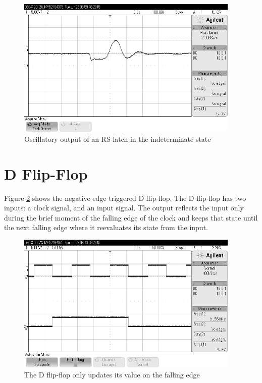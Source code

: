 \documentclass[11pt]{article}
\begin{document}
\begin{figure}[htpb]
	\centering
	\includegraphics[width=0.95\textwidth]{rs_latch}
	\caption{Oscillatory output of an RS latch in the indeterminate state}
	\label{fig:rs_latch}
\end{figure}

\section{D Flip-Flop}

Figure \ref{fig:d-ff} shows the negative edge triggered D flip-flop. The D flip-flop has two inputs: a clock signal, and an input signal. The output reflects the input only during the brief moment of the falling edge of the clock and keeps that state until the next falling edge where it reevaluates its state from the input. 

\begin{figure}[htpb]
	\centering
	\includegraphics[width=0.95\textwidth]{d-ff}
	\caption{The D flip-flop only updates its value on the falling edge}
	\label{fig:d-ff}
\end{figure}
\end{document}
